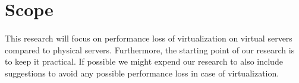 \section{Scope}
\paragraph{}
This research will focus on performance loss of virtualization on virtual servers compared to physical servers. Furthermore, the starting point of our research is to keep it practical. If possible we might expend our research to also include suggestions to avoid any possible performance loss in case of virtualization. 